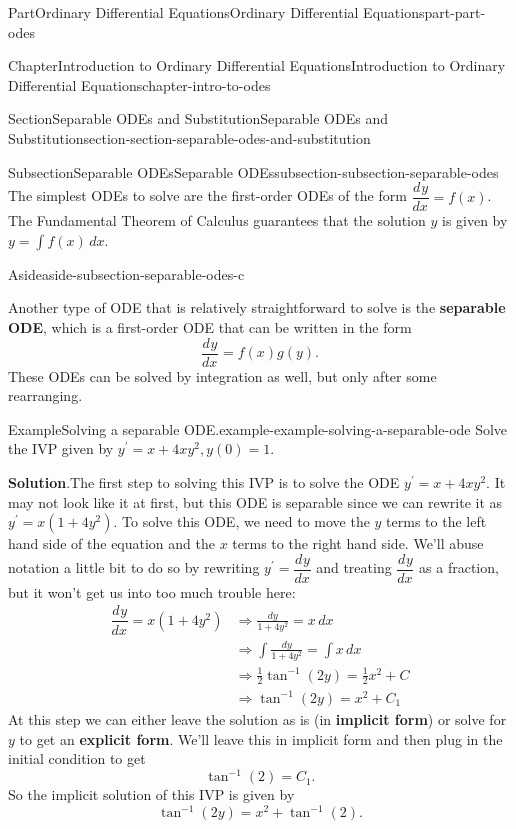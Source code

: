 \documentclass[twoside,10pt,]{book}
\newcommand{\blocktitlefont}{\relax}
\newcommand{\terminology}[1]{\textbf{#1}}
\numberwithin{equation}{part}
\newcommand{\dv}[3][]{\dfrac{d^{#1} #2}{d #3^{#1}}}
\begin{document}
\begin{partptx}{Part}{Ordinary Differential Equations}{}{Ordinary Differential Equations}{}{}{part-part-odes}
\begin{chapterptx}{Chapter}{Introduction to Ordinary Differential Equations}{}{Introduction to Ordinary Differential Equations}{}{}{chapter-intro-to-odes}
\begin{sectionptx}{Section}{Separable ODEs and Substitution}{}{Separable ODEs and Substitution}{}{}{section-section-separable-odes-and-substitution}
\begin{subsectionptx}{Subsection}{Separable ODEs}{}{Separable ODEs}{}{}{subsection-subsection-separable-odes}
The simplest ODEs to solve are the first-order ODEs of the form \(\dv{y}{x} = f(x)\). The Fundamental Theorem of Calculus guarantees that the solution \(y\) is given by \(y = \int f(x)\,dx\).%
\begin{aside}{Aside}{}{aside-subsection-separable-odes-c}%
\end{aside}
Another type of ODE that is relatively straightforward to solve is the \terminology{separable ODE}, which is a first-order ODE that can be written in the form%
%
\begin{equation*}
\dv{y}{x} = f(x)g(y).
\end{equation*}
These ODEs can be solved by integration as well, but only after some rearranging.%
\begin{example}{Example}{Solving a separable ODE.}{example-example-solving-a-separable-ode}%
Solve the IVP given by \(y^\prime = x+4xy^{2}, y(0)=1\).%
\par\smallskip%
\noindent\textbf{\blocktitlefont Solution}.\hypertarget{solution-example-solving-a-separable-ode-c}{}\quad{}The first step to solving this IVP is to solve the ODE \(y^\prime = x+4xy^{2}\). It may not look like it at first, but this ODE is separable since we can rewrite it as \(y^\prime = x(1+4y^{2})\). To solve this ODE, we need to move the \(y\) terms to the left hand side of the equation and the \(x\) terms to the right hand side. We'll abuse notation a little bit to do so by rewriting \(y^\prime = \dv{y}{x}\) and treating \(\dv{y}{x}\) as a fraction, but it won't get us into too much trouble here:%
%
\begin{align*}
\dv{y}{x} = x(1+4y^{2}) &\Rightarrow \frac{dy}{1+4y^{2}} = x\,dx \\
&\Rightarrow \int\frac{dy}{1+4y^{2}}  = \int x\,dx \\
&\Rightarrow \frac{1}{2}\tan^{-1}(2y)  = \frac{1}{2}x^{2}+C \\
&\Rightarrow \tan^{-1}(2y)  = x^{2}+C_{1} 
\end{align*}
At this step we can either leave the solution as is (in \terminology{implicit form}) or solve for \(y\) to get an \terminology{explicit form}. We'll leave this in implicit form and then plug in the initial condition to get%
\begin{equation*}
\tan^{-1}(2) = C_{1}.
\end{equation*}
So the implicit solution of this IVP is given by%
\begin{equation*}
\tan^{-1}(2y) = x^{2}+\tan^{-1}(2).
\end{equation*}
%

\end{example}
\end{subsectionptx}
\end{sectionptx}
\end{chapterptx}
\end{partptx}
\end{document}
